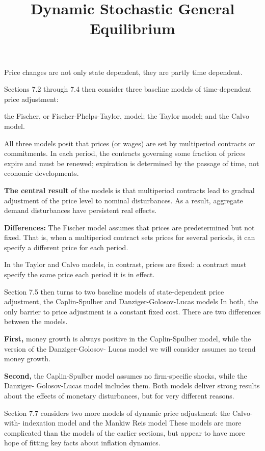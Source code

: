 \documentclass[12pt]{article}
\title{Dynamic Stochastic General Equilibrium}
\author{}
\date{}
\begin{document}
\maketitle
Price changes are not only state dependent, they are partly time dependent.

Sections 7.2 through 7.4 then consider three baseline models
of time-dependent price adjustment:

the Fischer, or Fischer-Phelps-Taylor,
model; the Taylor model; and the Calvo model. 

All three models posit that prices (or wages) are set by multiperiod contracts or 
commitments. In each period, the contracts governing some fraction of prices expire and 
must be renewed; expiration is determined by the passage of time, not economic
developments.

{\textbf {The central result}} of the models is that multiperiod contracts
lead to gradual adjustment of the price level to nominal disturbances. As a
result, aggregate demand disturbances have persistent real effects.


{\textbf {Differences:}}
The Fischer model assumes that prices are predetermined but not fixed.
That is, when a multiperiod contract sets prices for several
periods, it can specify a different price for each period. 

In the Taylor and Calvo models, in contrast, prices are fixed: a contract must specify 
the same price each period it is in effect.


Section 7.5 then turns to two baseline models of state-dependent price
adjustment, the Caplin-Spulber and Danziger-Golosov-Lucas models
In both, the only barrier to price adjustment is a constant fixed cost. There are two
differences between the models.

{\textbf {First,}} money growth is always positive
in the Caplin-Spulber model, while the version of the Danziger-Golosov-
Lucas model we will consider assumes no trend money growth. 

{\textbf {Second,}} the
Caplin-Spulber model assumes no firm-specific shocks, while the Danziger-
Golosov-Lucas model includes them. Both models deliver strong results
about the effects of monetary disturbances, but for very different reasons.

Section 7.7 considers two more models of dynamic price adjustment: the Calvo-with-
indexation model and the Mankiw Reis model
These models are more complicated than the models of the earlier sections, but appear 
to have more hope of fitting key facts about inflation dynamics.
\end{document}
